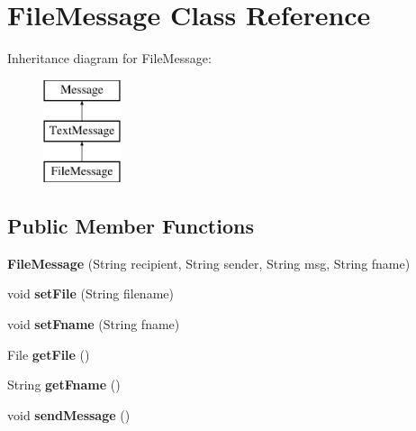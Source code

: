 \hypertarget{class_file_message}{}\section{File\+Message Class Reference}
\label{class_file_message}
Inheritance diagram for File\+Message\+:\begin{figure}[H]
\begin{center}
\leavevmode
\includegraphics[height=3.000000cm]{class_file_message}
\end{center}
\end{figure}
\subsection*{Public Member Functions}
\begin{DoxyCompactItemize}
\item 
\mbox{\label{class_file_message_a04a932a284d897e4a5412ae2b3a990a9}} 
{\bfseries File\+Message} (String recipient, String sender, String msg, String fname)
\item 
\mbox{\label{class_file_message_a0b6a6e6b6c3147a474b1eb523f470cfc}} 
void {\bfseries set\+File} (String filename)
\item 
\mbox{\label{class_file_message_a7a820fde575ed8d0f3dc295717fbbfb8}} 
void {\bfseries set\+Fname} (String fname)
\item 
\mbox{\label{class_file_message_a04db9bc0352aad2ff49d242ed6c4e76b}} 
File {\bfseries get\+File} ()
\item 
\mbox{\label{class_file_message_aa9d74a056bfb3d9870deeab6addd1280}} 
String {\bfseries get\+Fname} ()
\item 
\mbox{\label{class_file_message_a3286338704a438494c2b54aa300cf163}} 
void {\bfseries send\+Message} ()
\end{DoxyCompactItemize}
